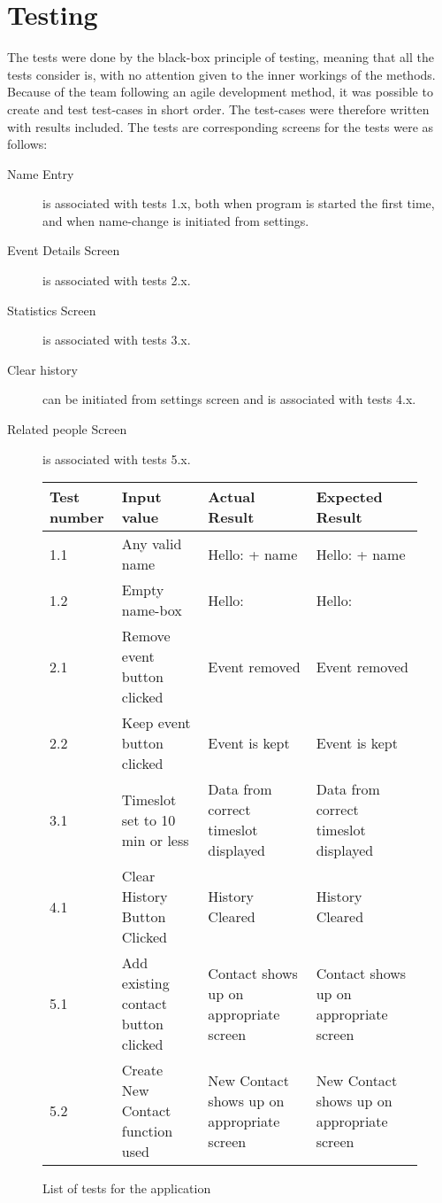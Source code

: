 \section{Testing}
The tests were done by the black-box principle of testing, meaning that all the tests consider is, with no attention given to the inner workings of the methods. Because of the team following an agile development method, it was possible to create and test test-cases in short order. The test-cases were therefore written with results included.
The tests are corresponding screens for the tests were as follows:
\begin{description}
\item[Name Entry] is associated with tests 1.x, both when program is started the first time, and when name-change is initiated from settings.
\item[Event Details Screen] is associated with tests 2.x.
\item[Statistics Screen] is associated with tests 3.x.
\item[Clear history] can be initiated from settings screen and is associated with tests 4.x.
\item[Related people Screen] is associated with tests 5.x. 
\end{description}

\begin{figure}[h]
\label{tab:testList}
\caption{List of tests for the application}
\begin{tabular}{|p{}||p{}|p{}|p{}|}
\hline
Test number & Input value& Actual Result& Expected Result \\
\hline
\hline 
1.1 & Any valid name & Hello: + name & Hello: + name \\ 
\hline 
1.2 & Empty name-box & Hello: &Hello:  \\ 
\hline 
2.1 & Remove event button clicked & Event removed & Event removed \\ 
\hline 
2.2 & Keep event button clicked & Event is kept & Event is kept \\ 
\hline 
3.1 & Timeslot set to 10 min or less & Data from correct timeslot displayed & Data from correct timeslot displayed \\ 
\hline 
4.1 & Clear History Button Clicked & History Cleared & History Cleared \\ 
\hline 
5.1 & Add existing contact button clicked & Contact shows up on appropriate screen  & Contact shows up on appropriate screen \\ 
\hline 
5.2 & Create New Contact function used & New Contact shows up on appropriate screen & New Contact shows up on appropriate screen \\ 
\hline 

\end{tabular} 
\end{figure}
